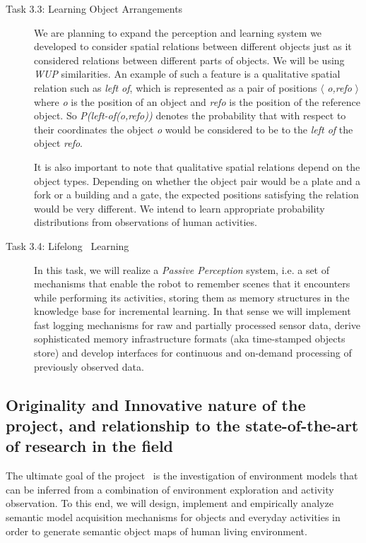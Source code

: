 \begin{description}
\item[Task 3.3: Learning Object Arrangements]
  We are planning to expand the perception and learning system we developed
  to consider spatial relations between different objects just as it considered relations between
  different parts of objects. We will be using \emph{WUP} similarities.
  An example of such a feature is a qualitative spatial relation
  such as \emph{left of}, which is represented as a 
  pair of positions $\langle$ \emph{o,refo} $\rangle$ where
  \emph{o} is the position of an object and
  \emph{refo} is the position of the reference object. So
  \emph{P(left-of(o,refo))} denotes the probability that with
  respect to their coordinates the object \emph{o} would be
  considered to be to the \emph{left of} the object \emph{refo}.

  It is also important to note that qualitative spatial relations
  depend on the object types. Depending on whether the
  object pair would be a plate and a fork or a building and a gate,
  the expected positions satisfying the relation would be very
  different. We intend to learn appropriate probability distributions
  from observations of human activities.

\item[Task 3.4: Lifelong \ksem\ Learning]
  In this task, we will realize a 
  \emph{Passive Perception} system, i.e. a set of mechanisms that enable the robot to 
  remember scenes that it encounters while performing its activities, storing them 
  as memory structures in the knowledge base for incremental learning. In that sense we will implement fast 
  logging mechanisms for raw and partially processed sensor data, derive
  sophisticated memory infrastructure formats (aka time-stamped objects store) 
  and develop interfaces for continuous and on-demand processing of previously observed data.
\end{description}
\subsection{Originality and Innovative nature of the project, and relationship to the state-of-the-art of 
research in the field}
The ultimate goal of the project \ksem\ is the investigation of 
environment models that can be inferred from a combination of 
environment exploration and activity observation. To this end, we 
will design, implement and empirically analyze semantic model 
acquisition mechanisms for objects and everyday activities in order 
to generate semantic object maps of human living environment.


